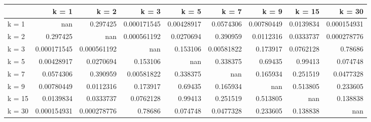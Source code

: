 \begin{tabular}{lrrrrrrrr}
\toprule
        &         k = 1 &         k = 2 &         k = 3 &        k = 5 &        k = 7 &        k = 9 &      k = 15 &        k = 30 \\
\midrule
 k = 1  & nan           &   0.297425    &   0.000171545 &   0.00428917 &   0.0574306  &   0.00780449 &   0.0139834 &   0.000154931 \\
 k = 2  &   0.297425    & nan           &   0.000561192 &   0.0270694  &   0.390959   &   0.0112316  &   0.0333737 &   0.000278776 \\
 k = 3  &   0.000171545 &   0.000561192 & nan           &   0.153106   &   0.00581822 &   0.173917   &   0.0762128 &   0.78686     \\
 k = 5  &   0.00428917  &   0.0270694   &   0.153106    & nan          &   0.338375   &   0.69435    &   0.99413   &   0.074748    \\
 k = 7  &   0.0574306   &   0.390959    &   0.00581822  &   0.338375   & nan          &   0.165934   &   0.251519  &   0.0477328   \\
 k = 9  &   0.00780449  &   0.0112316   &   0.173917    &   0.69435    &   0.165934   & nan          &   0.513805  &   0.233605    \\
 k = 15 &   0.0139834   &   0.0333737   &   0.0762128   &   0.99413    &   0.251519   &   0.513805   & nan         &   0.138838    \\
 k = 30 &   0.000154931 &   0.000278776 &   0.78686     &   0.074748   &   0.0477328  &   0.233605   &   0.138838  & nan           \\
\bottomrule
\end{tabular}